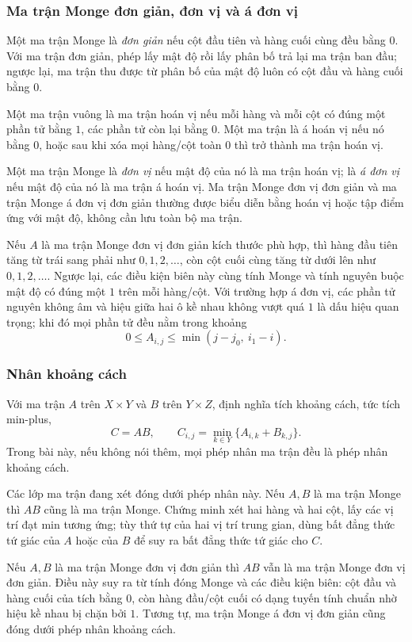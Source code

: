 \documentclass[11pt]{article}
\begin{document}
\subsubsection{Ma trận Monge đơn giản, đơn vị và á đơn vị}

Một ma trận Monge là \emph{đơn giản} nếu cột đầu tiên và hàng cuối cùng đều
bằng $0$. Với ma trận đơn giản, phép lấy mật độ rồi lấy phân bố trả lại ma trận
ban đầu; ngược lại, ma trận thu được từ phân bố của mật độ luôn có cột đầu và
hàng cuối bằng $0$.

Một ma trận vuông là ma trận hoán vị nếu mỗi hàng và mỗi cột có đúng một phần
tử bằng $1$, các phần tử còn lại bằng $0$. Một ma trận là á hoán vị nếu nó
bằng $0$, hoặc sau khi xóa mọi hàng/cột toàn $0$ thì trở thành ma trận hoán vị.

Một ma trận Monge là \emph{đơn vị} nếu mật độ của nó là ma trận hoán vị; là
\emph{á đơn vị} nếu mật độ của nó là ma trận á hoán vị. Ma trận Monge đơn vị
đơn giản và ma trận Monge á đơn vị đơn giản thường được biểu diễn bằng hoán vị
hoặc tập điểm ứng với mật độ, không cần lưu toàn bộ ma trận.

Nếu $A$ là ma trận Monge đơn vị đơn giản kích thước phù hợp, thì hàng đầu tiên
tăng từ trái sang phải như $0,1,2,\ldots$, còn cột cuối cùng tăng từ dưới lên
như $0,1,2,\ldots$. Ngược lại, các điều kiện biên này cùng tính Monge và tính
nguyên buộc mật độ có đúng một $1$ trên mỗi hàng/cột. Với trường hợp á đơn vị,
các phần tử nguyên không âm và hiệu giữa hai ô kề nhau không vượt quá $1$ là
dấu hiệu quan trọng; khi đó mọi phần tử đều nằm trong khoảng
\[
  0\le A_{i,j}\le \min(j-j_0,\ i_1-i).
\]

\subsubsection{Nhân khoảng cách}

Với ma trận $A$ trên $X\times Y$ và $B$ trên $Y\times Z$, định nghĩa tích
khoảng cách, tức tích min-plus,
\[
  C=A B,\qquad
  C_{i,j}=\min_{k\in Y}\{A_{i,k}+B_{k,j}\}.
\]
Trong bài này, nếu không nói thêm, mọi phép nhân ma trận đều là phép nhân
khoảng cách.

Các lớp ma trận đang xét đóng dưới phép nhân này. Nếu $A,B$ là ma trận Monge
thì $AB$ cũng là ma trận Monge. Chứng minh xét hai hàng và hai cột, lấy các vị
trí đạt min tương ứng; tùy thứ tự của hai vị trí trung gian, dùng bất đẳng thức
tứ giác của $A$ hoặc của $B$ để suy ra bất đẳng thức tứ giác cho $C$.

Nếu $A,B$ là ma trận Monge đơn vị đơn giản thì $AB$ vẫn là ma trận Monge đơn vị
đơn giản. Điều này suy ra từ tính đóng Monge và các điều kiện biên: cột đầu
và hàng cuối của tích bằng $0$, còn hàng đầu/cột cuối có dạng tuyến tính chuẩn
nhờ hiệu kề nhau bị chặn bởi $1$. Tương tự, ma trận Monge á đơn vị đơn giản
cũng đóng dưới phép nhân khoảng cách.
\end{document}
